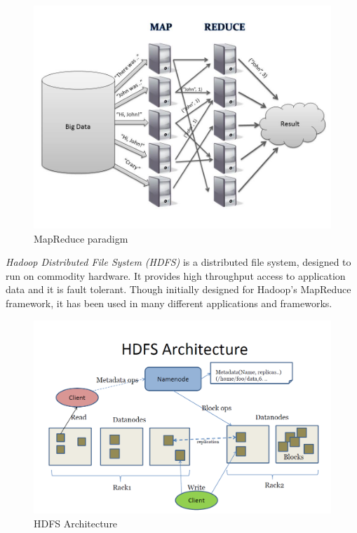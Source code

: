 \documentclass[english]{tktltiki}
\begin{document}
\begin{figure}[ht!]
\centering
\includegraphics[width=150mm]{figures/mapreduce.jpg}
\caption[]{MapReduce paradigm \footnotemark}

\label{fig:mapreducepara}
\end{figure}

\textit{Hadoop Distributed File System (HDFS)} is a distributed file system, designed to run on commodity hardware. It provides high throughput access to application data and it is fault tolerant. Though initially designed for Hadoop's MapReduce framework, it has been used in many different applications and frameworks.
\begin{figure}[ht!]
\centering
\includegraphics[width=150mm]{figures/hdfsarchitecture.png}
\caption[]{HDFS Architecture \protect \footnotemark}
\label{fig:hdfsarch}
\end{figure}
\end{document}
